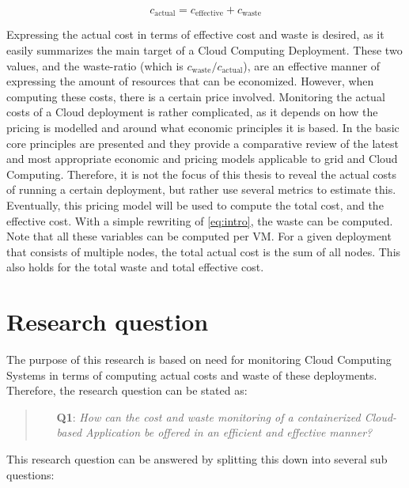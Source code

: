 \begin{equation}\label{eq:intro}
  c_\text{actual} = c_\text{effective} + c_\text{waste}  
\end{equation}

\noindent
Expressing the actual cost in terms of effective cost and waste is desired, as it easily summarizes the main target of a Cloud Computing Deployment. These two values, and the waste-ratio (which is $c_\text{waste} / c_\text{actual}$), are an effective manner of expressing the amount of resources that can be economized. However, when computing these costs, there is a certain price involved. Monitoring the actual costs of a Cloud deployment is rather complicated, as it depends on how the pricing is modelled and around what economic principles it is based. In \cite{samimi2011review} the basic core principles are presented and they provide a comparative review of the latest and most appropriate economic and pricing models applicable to grid and Cloud Computing. Therefore, it is not the focus of this thesis to reveal the actual costs of running a certain deployment, but rather use several metrics to estimate this. Eventually, this pricing model will be used to compute the total cost, and the effective cost. With a simple rewriting of \autoref{eq:intro}, the waste can be computed. Note that all these variables can be computed per VM. For a given deployment that consists of multiple nodes, the total actual cost is the sum of all nodes. This also holds for the total waste and total effective cost.

\section{Research question} \label{sec:research_question}
The purpose of this research is based on need for monitoring Cloud Computing Systems in terms of computing actual costs and waste of these deployments. Therefore, the research question can be stated as:

\begin{quote}
    \begin{itemize}
        \item[\textbf{Q1}: ]\textit{How can the cost and waste monitoring of a containerized Cloud-based Application be offered in an efficient and effective manner?}
    \end{itemize}
\end{quote}

\noindent
This research question can be answered by splitting this down into several sub questions:

